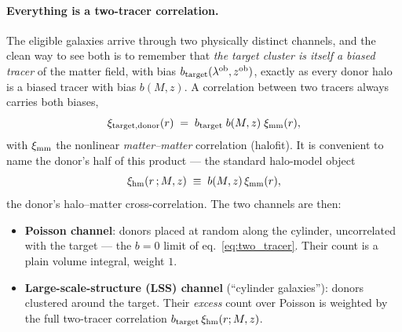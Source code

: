 \documentclass[a4paper, 11pt]{article}
\newcommand{\lob}{\lambda^{\rm ob}}
\newcommand{\zob}{z^{\rm ob}}
\newcommand{\ximm}{\xi_{\rm mm}}
\newcommand{\xihm}{\xi_{\rm hm}}
\newcommand{\btar}{b_{\rm target}}
\begin{document}
\paragraph{Everything is a two-tracer correlation.} The eligible
galaxies arrive through two physically distinct channels, and the
clean way to see both is to remember that \emph{the target
cluster is itself a biased tracer} of the matter field, with bias
$\btar(\lob,\zob)$, exactly as every donor halo is a biased
tracer with bias $b(M,z)$. A correlation between two tracers
always carries both biases,
\begin{equation}
\xi_{\rm target,donor}(r) \;=\; \btar\; b(M,z)\;\ximm(r),
\label{eq:two_tracer}
\end{equation}
with $\ximm$ the nonlinear \emph{matter--matter} correlation
(halofit). It is convenient to name the donor's half of this
product --- the standard halo-model object
\begin{equation}
\xihm(r\,;M,z) \;\equiv\; b(M,z)\,\ximm(r),
\label{eq:xihm}
\end{equation}
the donor's halo--matter cross-correlation. The two channels are
then:
\begin{itemize}
\item \textbf{Poisson channel}: donors placed at random along the
      cylinder, uncorrelated with the target --- the $b=0$ limit
      of eq.~\eqref{eq:two_tracer}. Their count is a plain volume
      integral, weight $1$.
\item \textbf{Large-scale-structure (LSS) channel} (``cylinder
      galaxies''): donors clustered around the target. Their
      \emph{excess} count over Poisson is weighted by the full
      two-tracer correlation
      $\btar\,\xihm(r;M,z)$.
\end{itemize}
\end{document}
